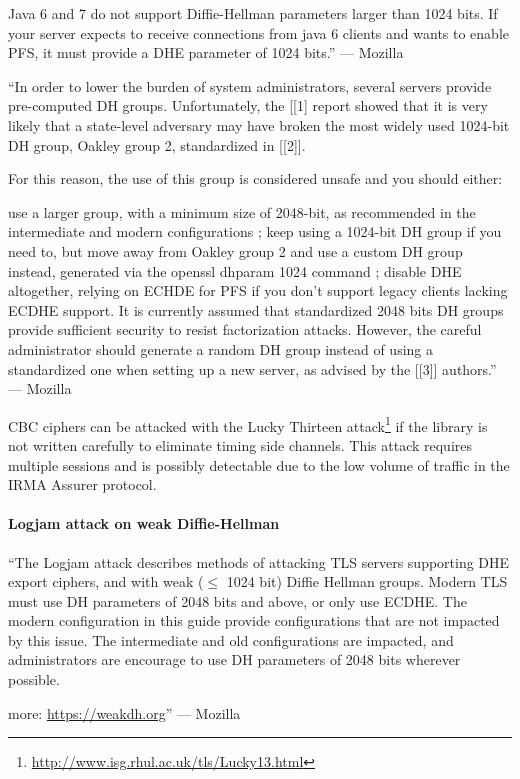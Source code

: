 Java 6 and 7 do not support Diffie-Hellman parameters larger than 1024 bits. If your server expects to receive connections from java 6 clients and wants to enable PFS, it must provide a DHE parameter of 1024 bits.'' --- Mozilla

``In order to lower the burden of system administrators, several servers provide pre-computed DH groups. Unfortunately, the [[1] report showed that it is very likely that a state-level adversary may have broken the most widely used 1024-bit DH group, Oakley group 2, standardized in [[2]].

For this reason, the use of this group is considered unsafe and you should either:

use a larger group, with a minimum size of 2048-bit, as recommended in the intermediate and modern configurations ;
keep using a 1024-bit DH group if you need to, but move away from Oakley group 2 and use a custom DH group instead, generated via the openssl dhparam 1024 command ;
disable DHE altogether, relying on ECHDE for PFS if you don't support legacy clients lacking ECDHE support.
It is currently assumed that standardized 2048 bits DH groups provide sufficient security to resist factorization attacks. However, the careful administrator should generate a random DH group instead of using a standardized one when setting up a new server, as advised by the [[3]] authors.'' --- Mozilla

CBC ciphers can be attacked with the Lucky Thirteen attack\footnote{\url{http://www.isg.rhul.ac.uk/tls/Lucky13.html}} if the library is not written carefully to eliminate timing side channels. This attack requires multiple sessions and is possibly detectable due to the low volume of traffic in the IRMA Assurer protocol.

\paragraph{Logjam attack on weak Diffie-Hellman}
``The Logjam attack describes methods of attacking TLS servers supporting DHE export ciphers, and with weak ($\leq$ 1024 bit) Diffie Hellman groups. Modern TLS must use DH parameters of 2048 bits and above, or only use ECDHE. The modern configuration in this guide provide configurations that are not impacted by this issue. The intermediate and old configurations are impacted, and administrators are encourage to use DH parameters of 2048 bits wherever possible.

more: \url{https://weakdh.org}'' --- Mozilla

